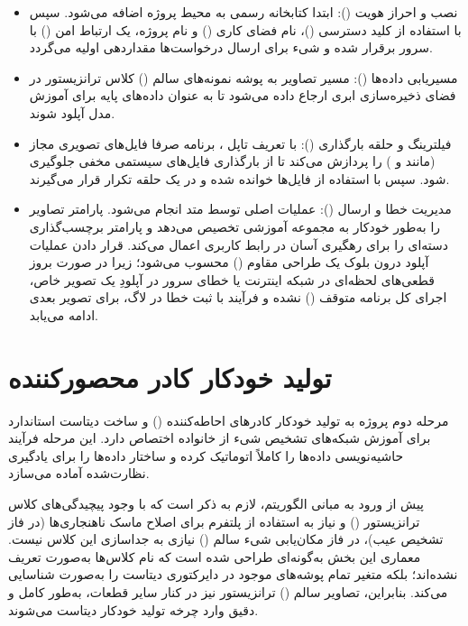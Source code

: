 \documentclass{article}
\begin{document}
\begin{itemize}
	\item نصب و احراز هویت (): ابتدا کتابخانه رسمی  به محیط پروژه اضافه می‌شود. سپس با استفاده از کلید دسترسی ()، نام فضای کاری () و نام پروژه، یک ارتباط امن () با سرور برقرار شده و شیء  برای ارسال درخواست‌ها مقداردهی اولیه می‌گردد.
	\item مسیریابی داده‌ها (): مسیر تصاویر به پوشه نمونه‌های سالم () کلاس ترانزیستور در فضای ذخیره‌سازی ابری ارجاع داده می‌شود تا به عنوان داده‌های پایه برای آموزش مدل آپلود شوند.
	\item فیلترینگ و حلقه بارگذاری (): با تعریف تاپل ، برنامه صرفا فایل‌های تصویری مجاز (مانند  و ) را پردازش می‌کند تا از بارگذاری فایل‌های سیستمی مخفی جلوگیری شود. سپس با استفاده از  فایل‌ها خوانده شده و در یک حلقه تکرار قرار می‌گیرند.
	\item مدیریت خطا و ارسال  (): عملیات اصلی توسط متد  انجام می‌شود. پارامتر  تصاویر را به‌طور خودکار به مجموعه آموزشی تخصیص می‌دهد و پارامتر  برچسب‌گذاری دسته‌ای را برای رهگیری آسان در رابط کاربری  اعمال می‌کند. قرار دادن عملیات آپلود درون بلوک  یک طراحی مقاوم () محسوب می‌شود؛ زیرا در صورت بروز قطعی‌های لحظه‌ای در شبکه اینترنت یا خطای سرور در آپلودِ یک تصویر خاص، اجرای کل برنامه متوقف () نشده و فرآیند با ثبت خطا در لاگ، برای تصویر بعدی ادامه می‌یابد.
\end{itemize}


\section{تولید خودکار کادر محصورکننده}

مرحله دوم پروژه به تولید خودکار کادرهای احاطه‌کننده () و ساخت دیتاست استاندارد برای آموزش شبکه‌های تشخیص شیء از خانواده  اختصاص دارد. این مرحله فرآیند حاشیه‌نویسی داده‌ها را کاملاً اتوماتیک کرده و ساختار داده‌ها را برای یادگیری نظارت‌شده آماده می‌سازد.

پیش از ورود به مبانی الگوریتم، لازم به ذکر است که با وجود پیچیدگی‌های کلاس ترانزیستور () و نیاز به استفاده از پلتفرم  برای اصلاح ماسک ناهنجاری‌ها (در فاز تشخیص عیب)، در فاز مکان‌یابی شیء سالم () نیازی به جداسازی این کلاس نیست. معماری این بخش به‌گونه‌ای طراحی شده است که نام کلاس‌ها به‌صورت تعریف نشده‌اند؛ بلکه متغیر  تمام پوشه‌های موجود در دایرکتوری دیتاست را به‌صورت  شناسایی می‌کند. بنابراین، تصاویر سالم () ترانزیستور نیز در کنار سایر قطعات، به‌طور کامل و دقیق وارد چرخه تولید خودکار دیتاست  می‌شوند.
\end{document}
